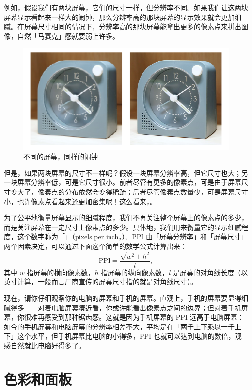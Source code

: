 例如，假设我们有两块屏幕，它们的尺寸一样，但分辨率不同。如果我们让这两块屏幕显示看起来一样大的闹钟，那么分辨率高的那块屏幕的显示效果就会更加细腻。在屏幕尺寸相同的情况下，分辨率高的那块屏幕能拿出更多的像素点来拼出图像，自然「马赛克」感就要弱上许多。

\begin{figure}[htb!]
  \centering
  \includegraphics[width=.8\textwidth]{assets/advanced/PPI_differences.png}
  \caption{不同的屏幕，同样的闹钟}
  \label{fig:PPI_differences}
\end{figure}

但是，如果两块屏幕的尺寸不一样呢？假设一块屏幕分辨率高，但它尺寸也大；另一块屏幕分辨率低，可是它尺寸很小。前者尽管有更多的像素点，可是由于屏幕尺寸变大了，像素点的分布依然会变得稀疏；后者尽管像素点数量少，可是屏幕尺寸小，也许像素点看起来还更加密集呢！这么看来，。

为了公平地衡量屏幕显示的细腻程度，我们不再关注整个屏幕上的像素点的多少，而是关注屏幕在一定尺寸上像素点的多少。具体地，我们用来衡量它的显示细腻程度，这个数字称为「」（pixels per inch，）。PPI 由「屏幕分辨率」和「屏幕尺寸」两个因素决定，可以通过下面这个简单的数学公式计算出来：
\[
  \mathrm{PPI} = \frac{\sqrt{w^2 + h^2}}{l},
\]
其中 $w$ 指屏幕的横向像素数，$h$ 指屏幕的纵向像素数，$l$ 是屏幕的对角线长度（以英寸计算，一般而言厂商宣传的屏幕尺寸指的就是对角线尺寸）。

现在，请你仔细观察你的电脑的屏幕和手机的屏幕。直观上，手机的屏幕要显得细腻得多——对着电脑屏幕凑近看，你或许能看出像素点之间的边界；但对着手机屏幕，你很难再感受到那种锯齿感。这就是因为手机屏幕的 PPI 远高于电脑屏幕：如今的手机屏幕和电脑屏幕的分辨率相差不大，平均是在「两千上下乘以一千上下」这个水平，但手机屏幕比电脑的小得多，PPI 也就可以达到电脑的数倍，观感自然就比电脑好得多了。

\section{色彩和面板}

